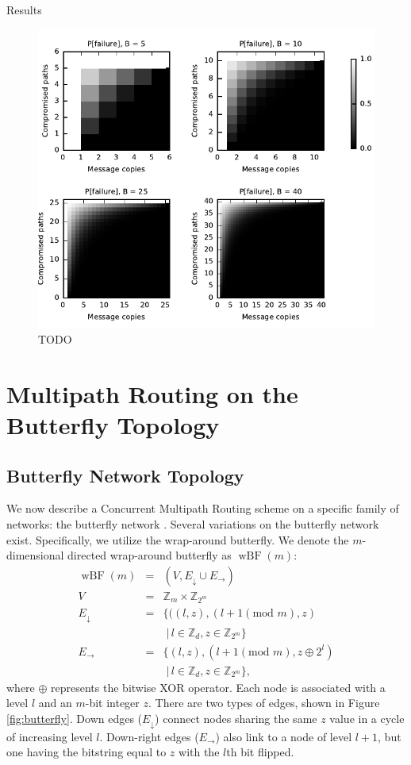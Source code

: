 \documentclass[prodmode,permissions]{acmsmall-ec16}
\newcommand{\beq}{\begin{eqnarray}}
\newcommand{\eeq}{\end{eqnarray}}
\DeclareMathOperator{\wbf}{wBF}
\begin{document}
Results

\begin{figure}
\centerline{\includegraphics{fig-perror}}
\caption{TODO}
\label{fig:one}
\end{figure}

\section{Multipath Routing on the Butterfly Topology}

\subsection{Butterfly Network Topology}

We now describe a Concurrent Multipath Routing scheme on a specific family
of networks: the butterfly network \cite{}.
Several variations on the butterfly network exist.
Specifically, we utilize the wrap-around butterfly.
We denote the $m$-dimensional directed wrap-around butterfly as $\wbf(m)$:
\beq
\wbf(m) &=& (V, E_\downarrow \cup E_\rightarrow) \\
V &=& \mathbb{Z}_m \times \mathbb{Z}_{2^m} \\
E_\downarrow &=& \{((l,z),(l+1 (\text{mod } m),z) \nonumber \\
&& \; | \, l \in \mathbb{Z}_d, z \in \mathbb{Z}_{2^m}\} \\
E_\rightarrow &=& \{(l,z),(l+1 (\text{mod } m), z \oplus 2^l) \nonumber \\
&& \; | \, l \in \mathbb{Z}_d, z \in \mathbb{Z}_{2^m}\},
\eeq
where $\oplus$ represents the bitwise XOR operator.
Each node is associated with a level $l$ and an $m$-bit integer $z$.
There are two types of edges, shown in Figure \ref{fig:butterfly}.
Down edges ($E_\downarrow$) connect nodes sharing the same $z$ value
in a cycle of increasing level $l$.
Down-right edges ($E_\rightarrow$) also link to a node of level $l + 1$,
but one having the bitstring equal to $z$ with the $l$th bit flipped.
\end{document}
